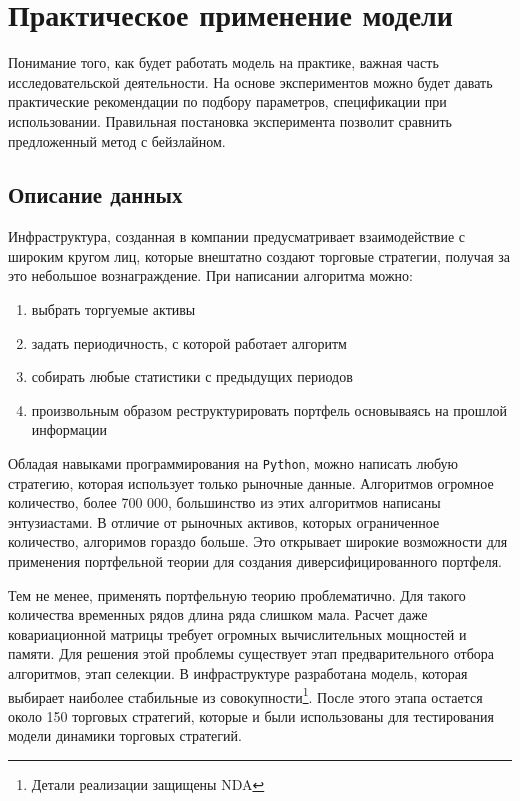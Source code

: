 \chapter{Практическое применение модели}
Понимание того, как будет работать модель на практике, важная часть исследовательской деятельности. На основе экспериментов можно будет давать практические рекомендации по подбору параметров, спецификации при использовании. Правильная постановка эксперимента позволит сравнить предложенный метод с бейзлайном.

\section{Описание данных}
Инфраструктура, созданная в компании предусматривает взаимодействие с широким кругом лиц, которые внештатно создают торговые стратегии, получая за это небольшое вознаграждение. При написании алгоритма можно:
\begin{enumerate}
	\item выбрать торгуемые активы
	\item задать периодичность, с которой работает алгоритм
	\item собирать любые статистики с предыдущих периодов
	\item произвольным образом реструктурировать портфель основываясь на прошлой информации
\end{enumerate}
Обладая навыками программирования на \texttt{Python}, можно написать любую стратегию, которая использует только рыночные данные. Алгоритмов огромное количество, более 700 000, большинство из этих алгоритмов написаны энтузиастами. В отличие от рыночных активов, которых ограниченное количество, алгоримов гораздо больше. Это открывает широкие возможности для применения портфельной теории для создания диверсифицированного портфеля.

Тем не менее, применять портфельную теорию проблематично. Для такого количества временных рядов длина ряда слишком мала. Расчет даже ковариационной матрицы требует огромных вычислительных мощностей и памяти. Для решения этой проблемы существует этап предварительного отбора алгоритмов, этап селекции. В инфраструктуре разработана модель, которая выбирает наиболее стабильные из совокупности\footnote{Детали реализации защищены NDA}. После этого этапа остается около 150 торговых стратегий, которые и были использованы для тестирования модели динамики торговых стратегий.


